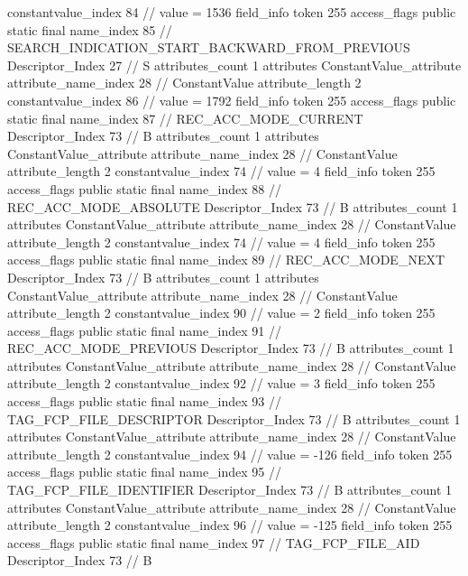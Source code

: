 {{{{{{{					constantvalue_index	84		// value = 1536
				}
				}
			}
			field_info {
				token	255
				access_flags	public static final
				name_index	85		// SEARCH_INDICATION_START_BACKWARD_FROM_PREVIOUS
				Descriptor_Index	27		// S
				attributes_count	1
				attributes {
				ConstantValue_attribute {
					attribute_name_index	28		// ConstantValue
					attribute_length	2
					constantvalue_index	86		// value = 1792
				}
				}
			}
			field_info {
				token	255
				access_flags	public static final
				name_index	87		// REC_ACC_MODE_CURRENT
				Descriptor_Index	73		// B
				attributes_count	1
				attributes {
				ConstantValue_attribute {
					attribute_name_index	28		// ConstantValue
					attribute_length	2
					constantvalue_index	74		// value = 4
				}
				}
			}
			field_info {
				token	255
				access_flags	public static final
				name_index	88		// REC_ACC_MODE_ABSOLUTE
				Descriptor_Index	73		// B
				attributes_count	1
				attributes {
				ConstantValue_attribute {
					attribute_name_index	28		// ConstantValue
					attribute_length	2
					constantvalue_index	74		// value = 4
				}
				}
			}
			field_info {
				token	255
				access_flags	public static final
				name_index	89		// REC_ACC_MODE_NEXT
				Descriptor_Index	73		// B
				attributes_count	1
				attributes {
				ConstantValue_attribute {
					attribute_name_index	28		// ConstantValue
					attribute_length	2
					constantvalue_index	90		// value = 2
				}
				}
			}
			field_info {
				token	255
				access_flags	public static final
				name_index	91		// REC_ACC_MODE_PREVIOUS
				Descriptor_Index	73		// B
				attributes_count	1
				attributes {
				ConstantValue_attribute {
					attribute_name_index	28		// ConstantValue
					attribute_length	2
					constantvalue_index	92		// value = 3
				}
				}
			}
			field_info {
				token	255
				access_flags	public static final
				name_index	93		// TAG_FCP_FILE_DESCRIPTOR
				Descriptor_Index	73		// B
				attributes_count	1
				attributes {
				ConstantValue_attribute {
					attribute_name_index	28		// ConstantValue
					attribute_length	2
					constantvalue_index	94		// value = -126
				}
				}
			}
			field_info {
				token	255
				access_flags	public static final
				name_index	95		// TAG_FCP_FILE_IDENTIFIER
				Descriptor_Index	73		// B
				attributes_count	1
				attributes {
				ConstantValue_attribute {
					attribute_name_index	28		// ConstantValue
					attribute_length	2
					constantvalue_index	96		// value = -125
				}
				}
			}
			field_info {
				token	255
				access_flags	public static final
				name_index	97		// TAG_FCP_FILE_AID
				Descriptor_Index	73		// B
}}}}}
